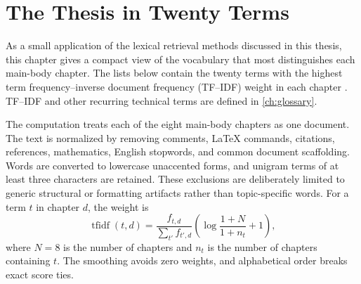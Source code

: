 \chapter{The Thesis in Twenty Terms}
\label{appendix:chapter-tfidf}

As a small application of the lexical retrieval methods discussed in this
thesis, this chapter gives a compact view of the vocabulary that most
distinguishes each main-body chapter. The lists below contain the twenty terms
with the highest term frequency--inverse document frequency (TF--IDF) weight in
each chapter . TF--IDF and other
recurring technical terms are defined in \autoref{ch:glossary}.

The computation treats each of the eight main-body chapters as one document.
The text is normalized by removing comments, LaTeX commands, citations,
references, mathematics, English stopwords, and common document scaffolding.
Words are converted to lowercase unaccented forms, and unigram terms of at
least three characters are retained. These exclusions are deliberately limited
to generic structural or formatting artifacts rather than topic-specific words.
For a term $t$ in chapter $d$, the weight is
\[
  \operatorname{tfidf}(t,d)
  =
  \frac{f_{t,d}}{\sum_{t'} f_{t',d}}
  \left(
    \log\frac{1 + N}{1 + n_t} + 1
  \right),
\]
where $N=8$ is the number of chapters and $n_t$ is the number of chapters
containing $t$. The smoothing avoids zero weights, and alphabetical order
breaks exact score ties.


